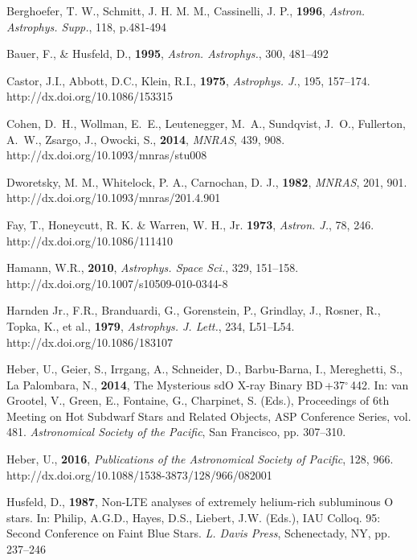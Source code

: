 \documentclass[USenglish,twocolumn]{article}
\def\BDone{BD\,+37$^\circ$\,442}
\begin{document}
\begin{thebibliography}{}

Berghoefer, T. W., Schmitt, J. H. M. M., Cassinelli, J. P., \textbf{1996}, \textit{Astron. Astrophys. Supp.}, 118, p.481-494 

Bauer, F., \& Husfeld, D., \textbf{1995}, \textit{Astron. Astrophys.}, 300, 481–492

Castor, J.I., Abbott, D.C., Klein, R.I., \textbf{1975}, \textit{Astrophys. J.}, 195, 157–174. http://dx.doi.org/10.1086/153315

 Cohen, D.~H., Wollman, E.~E., Leutenegger, M.~A., Sundqvist, J.~O., Fullerton, A.~W., Zsargo, J., Owocki, S., \textbf{2014}, \textit{MNRAS}, 439, 908. http://dx.doi.org/10.1093/mnras/stu008

Dworetsky, M. M., Whitelock, P. A., Carnochan, D. J., \textbf{1982}, \textit{MNRAS}, 201, 901. http://dx.doi.org/10.1093/mnras/201.4.901

Fay, T., Honeycutt, R. K. \& Warren, W. H., Jr. \textbf{1973}, \textit{Astron. J.}, 78, 246. http://dx.doi.org/10.1086/111410

Hamann, W.R., \textbf{2010}, \textit{Astrophys. Space Sci.}, 329, 151–158. http://dx.doi.org/10.1007/s10509-010-0344-8

Harnden Jr., F.R., Branduardi, G., Gorenstein, P., Grindlay, J., Rosner, R., Topka, K., et al., \textbf{1979}, \textit{Astrophys. J. Lett.}, 234, L51–L54. http://dx.doi.org/10.1086/183107

Heber, U., Geier, S., Irrgang, A., Schneider, D., Barbu-Barna, I., Mereghetti, S., La Palombara, N., \textbf{2014}, The Mysterious sdO X-ray Binary \BDone. In: van Grootel, V., Green, E., Fontaine, G., Charpinet, S. (Eds.), Proceedings of 6th Meeting on Hot Subdwarf Stars and Related Objects, ASP Conference Series, vol. 481. \textit{Astronomical Society of the Pacific}, San Francisco, pp. 307–310.

Heber, U., \textbf{2016}, \textit{Publications of the Astronomical Society of Pacific}, 128, 966. http://dx.doi.org/10.1088/1538-3873/128/966/082001

Husfeld, D., \textbf{1987}, Non-LTE analyses of extremely helium-rich subluminous O stars. In: Philip, A.G.D., Hayes, D.S., Liebert, J.W. (Eds.), IAU Colloq. 95: Second Conference on Faint Blue Stars. \textit{L. Davis Press}, Schenectady, NY, pp. 237–246


\end{thebibliography}
\end{document}
